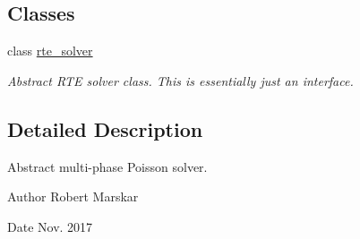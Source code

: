 \subsection*{Classes}
\begin{DoxyCompactItemize}
\item 
class \hyperlink{classrte__solver}{rte\+\_\+solver}
\begin{DoxyCompactList}\small\item\em Abstract R\+TE solver class. This is essentially just an interface. \end{DoxyCompactList}\end{DoxyCompactItemize}


\subsection{Detailed Description}
Abstract multi-\/phase Poisson solver. 

\begin{DoxyAuthor}{Author}
Robert Marskar 
\end{DoxyAuthor}
\begin{DoxyDate}{Date}
Nov. 2017 
\end{DoxyDate}
